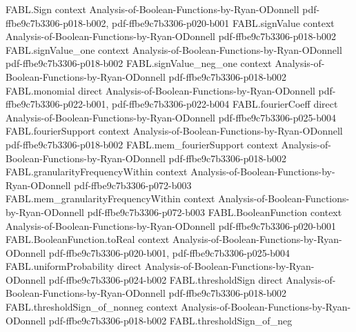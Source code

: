 \begin{theorem}
\label{FABL.booleanInfluence_eq_influence_toReal}
\leanok
{}
\proofstep
  {FABL.Sign}
  {context}
  {Analysis-of-Boolean-Functions-by-Ryan-ODonnell}
  {pdf-ffbe9c7b3306-p018-b002,
    pdf-ffbe9c7b3306-p020-b001}
\proofstep
  {FABL.signValue}
  {context}
  {Analysis-of-Boolean-Functions-by-Ryan-ODonnell}
  {pdf-ffbe9c7b3306-p018-b002}
\proofstep
  {FABL.signValue_one}
  {context}
  {Analysis-of-Boolean-Functions-by-Ryan-ODonnell}
  {pdf-ffbe9c7b3306-p018-b002}
\proofstep
  {FABL.signValue_neg_one}
  {context}
  {Analysis-of-Boolean-Functions-by-Ryan-ODonnell}
  {pdf-ffbe9c7b3306-p018-b002}
\proofstep
  {FABL.monomial}
  {direct}
  {Analysis-of-Boolean-Functions-by-Ryan-ODonnell}
  {pdf-ffbe9c7b3306-p022-b001,
    pdf-ffbe9c7b3306-p022-b004}
\proofstep
  {FABL.fourierCoeff}
  {direct}
  {Analysis-of-Boolean-Functions-by-Ryan-ODonnell}
  {pdf-ffbe9c7b3306-p025-b004}
\proofstep
  {FABL.fourierSupport}
  {context}
  {Analysis-of-Boolean-Functions-by-Ryan-ODonnell}
  {pdf-ffbe9c7b3306-p018-b002}
\proofstep
  {FABL.mem_fourierSupport}
  {context}
  {Analysis-of-Boolean-Functions-by-Ryan-ODonnell}
  {pdf-ffbe9c7b3306-p018-b002}
\proofstep
  {FABL.granularityFrequencyWithin}
  {context}
  {Analysis-of-Boolean-Functions-by-Ryan-ODonnell}
  {pdf-ffbe9c7b3306-p072-b003}
\proofstep
  {FABL.mem_granularityFrequencyWithin}
  {context}
  {Analysis-of-Boolean-Functions-by-Ryan-ODonnell}
  {pdf-ffbe9c7b3306-p072-b003}
\proofstep
  {FABL.BooleanFunction}
  {context}
  {Analysis-of-Boolean-Functions-by-Ryan-ODonnell}
  {pdf-ffbe9c7b3306-p020-b001}
\proofstep
  {FABL.BooleanFunction.toReal}
  {context}
  {Analysis-of-Boolean-Functions-by-Ryan-ODonnell}
  {pdf-ffbe9c7b3306-p020-b001,
    pdf-ffbe9c7b3306-p025-b004}
\proofstep
  {FABL.uniformProbability}
  {direct}
  {Analysis-of-Boolean-Functions-by-Ryan-ODonnell}
  {pdf-ffbe9c7b3306-p024-b002}
\proofstep
  {FABL.thresholdSign}
  {direct}
  {Analysis-of-Boolean-Functions-by-Ryan-ODonnell}
  {pdf-ffbe9c7b3306-p018-b002}
\proofstep
  {FABL.thresholdSign_of_nonneg}
  {context}
  {Analysis-of-Boolean-Functions-by-Ryan-ODonnell}
  {pdf-ffbe9c7b3306-p018-b002}
\proofstep
  {FABL.thresholdSign_of_neg}

\end{theorem}
